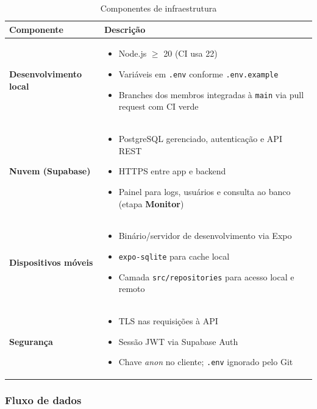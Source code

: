 \begin{table}[H]
\centering
\caption{Componentes de infraestrutura}
\label{tab:infrastructure}
\begin{tabular}{|l|p{10cm}|}
\hline
\textbf{Componente} & \textbf{Descrição} \\
\hline
\textbf{Desenvolvimento local} &
\begin{itemize}[leftmargin=*, nosep]
    \item Node.js $\geq$ 20 (CI usa 22)
    \item Variáveis em \texttt{.env} conforme \texttt{.env.example}
    \item Branches dos membros integradas à \texttt{main} via pull request com CI verde
\end{itemize} \\
\hline
\textbf{Nuvem (Supabase)} &
\begin{itemize}[leftmargin=*, nosep]
    \item PostgreSQL gerenciado, autenticação e API REST
    \item HTTPS entre app e backend
    \item Painel para logs, usuários e consulta ao banco (etapa \textbf{Monitor})
\end{itemize} \\
\hline
\textbf{Dispositivos móveis} &
\begin{itemize}[leftmargin=*, nosep]
    \item Binário/servidor de desenvolvimento via Expo
    \item \texttt{expo-sqlite} para cache local
    \item Camada \texttt{src/repositories} para acesso local e remoto
\end{itemize} \\
\hline
\textbf{Segurança} &
\begin{itemize}[leftmargin=*, nosep]
    \item TLS nas requisições à API
    \item Sessão JWT via Supabase Auth
    \item Chave \textit{anon} no cliente; \texttt{.env} ignorado pelo Git
\end{itemize} \\
\hline
\end{tabular}
\end{table}

\subsubsection{Fluxo de dados}

